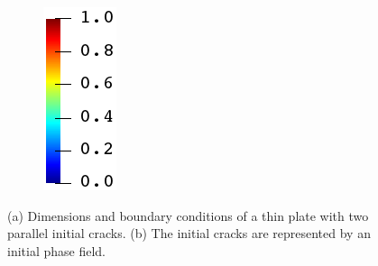 \begin{figure}[htb!]
\begin{subfigure}[b]{0.07\textwidth}
    \includegraphics[width=\textwidth]{Chapter4/figures/jet_vertical.png}
    \vspace{0.15in}
  \end{subfigure}
  \caption{(a) Dimensions and boundary conditions of a thin plate with two parallel initial cracks. (b) The initial cracks are represented by an initial phase field.}
  \label{fig: Chapter4/biaxial_schematic}
\end{figure}
